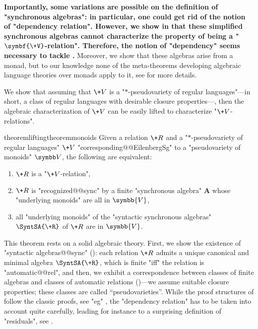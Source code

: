 \textbf{Importantly, some variations are possible on the definition of "synchronous algebras":
in particular, one could get rid of the notion of "dependency relation".
However, we show in  that these
simplified synchronous algebras cannot characterize the property of being a "$\symbf{\+V}$-relation".
Therefore, the notion of "dependency" seems necessary to tackle .}
Moreover, we show that these algebras arise from a monad, but to our knowledge none of the 
meta-theorems developing algebraic language theories over monads apply to it,
see  for more details.

We show that assuming that $\+V$ is a "$*$-pseudovariety of regular languages"---in short, a class of regular languages with desirable closure properties---, then the algebraic characterization of $\+V$ can be easily lifted to characterize "$\+V$-relations".

\begin{restatable*}{theorem}{liftingtheoremmonoids}
	\AP\label{thm:lifting-theorem-monoids}
	Given a relation $\+R$ and a "$\ast$-pseudovariety of regular languages" $\+V$
	"corresponding@@EilenbergSg" to a "pseudovariety of monoids" $\B{V}$,
	the following are equivalent:
	\begin{enumerate}
		\item $\+R$ is a "$\+V$-relation",
		\item $\+R$ is "recognized@@sync" by a finite "synchronous algebra" $\mathbf{A}$
			whose "underlying monoids" are all in $\symbb{V}$,
		\item all "underlying monoids" of the "syntactic synchronous algebras" $\SyntSA{\+R}$ of
			$\+R$ are in $\symbb{V}$.
	\end{enumerate} 
\end{restatable*}

This theorem rests on a solid algebraic theory. 
First, we show the existence of "syntactic algebras@@sync" (): 
each relation $\+R$ admits a unique canonical and minimal algebra $\SyntSA{\+R}$, which is finite 
"iff" the relation is "automatic@@rel",
and then, we exhibit a correspondence between classes of finite algebras and classes of
automatic relations ()---we assume suitable closure properties; these classes are called ``pseudovarieties''.
While the proof structures of  follow the classic proofs, see "eg" \cite{Pin2022MathematicalFoundations},
the "dependency relation" has to be taken into account quite carefully, leading for instance
to a surprising definition of "residuals", see .

